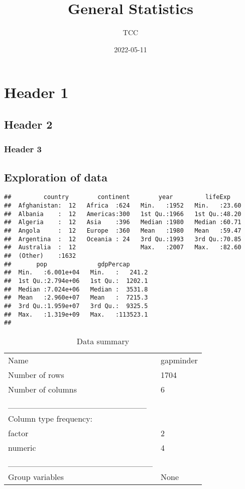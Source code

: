 \documentclass[
]{article}
\title{General Statistics}
\author{TCC}
\date{2022-05-11}
\begin{document}
\maketitle

\hypertarget{header-1}{%
\section{Header 1}\label{header-1}}

\hypertarget{header-2}{%
\subsection{Header 2}\label{header-2}}

\hypertarget{header-3}{%
\subsubsection{Header 3}\label{header-3}}

\hypertarget{exploration-of-data}{%
\subsection{Exploration of data}\label{exploration-of-data}}

\begin{verbatim}
##         country        continent        year         lifeExp     
##  Afghanistan:  12   Africa  :624   Min.   :1952   Min.   :23.60  
##  Albania    :  12   Americas:300   1st Qu.:1966   1st Qu.:48.20  
##  Algeria    :  12   Asia    :396   Median :1980   Median :60.71  
##  Angola     :  12   Europe  :360   Mean   :1980   Mean   :59.47  
##  Argentina  :  12   Oceania : 24   3rd Qu.:1993   3rd Qu.:70.85  
##  Australia  :  12                  Max.   :2007   Max.   :82.60  
##  (Other)    :1632                                                
##       pop              gdpPercap       
##  Min.   :6.001e+04   Min.   :   241.2  
##  1st Qu.:2.794e+06   1st Qu.:  1202.1  
##  Median :7.024e+06   Median :  3531.8  
##  Mean   :2.960e+07   Mean   :  7215.3  
##  3rd Qu.:1.959e+07   3rd Qu.:  9325.5  
##  Max.   :1.319e+09   Max.   :113523.1  
## 
\end{verbatim}

\begin{longtable}[]{@{}ll@{}}
\caption{Data summary}\tabularnewline
\toprule
\endhead
Name & gapminder \\
Number of rows & 1704 \\
Number of columns & 6 \\
\_\_\_\_\_\_\_\_\_\_\_\_\_\_\_\_\_\_\_\_\_\_\_ & \\
Column type frequency: & \\
factor & 2 \\
numeric & 4 \\
\_\_\_\_\_\_\_\_\_\_\_\_\_\_\_\_\_\_\_\_\_\_\_\_ & \\
Group variables & None \\
\bottomrule
\end{longtable}
\end{document}
